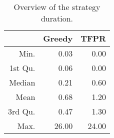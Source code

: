 \begin{table}[ht]
\centering
\begin{tabular}{rrr}
  \hline
 & Greedy & TFPR \\ 
  \hline
Min. & 0.03 & 0.00 \\ 
  1st Qu. & 0.06 & 0.00 \\ 
  Median & 0.21 & 0.60 \\ 
  Mean & 0.68 & 1.20 \\ 
  3rd Qu. & 0.47 & 1.30 \\ 
  Max. & 26.00 & 24.00 \\ 
   \hline
\end{tabular}
\caption{Overview of the strategy duration.} 
\label{tab:results:rq0:summary:duration}
\end{table}
